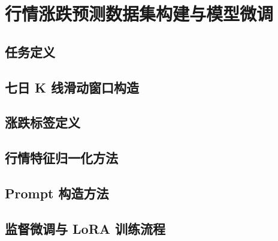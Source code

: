 
\chapter{行情涨跌预测数据集构建与模型微调}

\section{任务定义}

\section{七日 K 线滑动窗口构造}

\section{涨跌标签定义}

\section{行情特征归一化方法}

\section{Prompt 构造方法}

\section{监督微调与 LoRA 训练流程}
